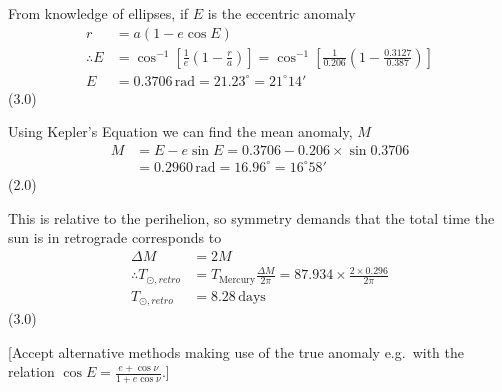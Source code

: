 From knowledge of ellipses, if $E$ is the eccentric anomaly
\begin{align*}
r &= a(1 - e\cos E)\\
\therefore E &= \cos^{-1}\left[\frac{1}{e}\left(1 - \frac{r}{a}\right)\right]
  = \cos^{-1}\left[\frac{1}{0.206}\left(1 - \frac{0.3127}{0.387}\right)\right]\\
E &= 0.3706\,\mathrm{rad} = 21.23^\circ = 21^\circ 14'
\end{align*}
\hfill(3.0)

Using Kepler's Equation we can find the mean anomaly, $M$
\begin{align*}
M &= E - e\sin E = 0.3706 - 0.206 \times \sin 0.3706\\
  &= 0.2960\,\mathrm{rad} = 16.96^\circ = 16^\circ 58'
\end{align*}
\hfill(2.0)

This is relative to the perihelion, so symmetry demands that the total time the sun is in
retrograde corresponds to
\begin{align*}
\Delta M &= 2M\\
\therefore T_{\odot,retro} &= T_{\mathrm{Mercury}}\frac{\Delta M}{2\pi}
  = 87.934 \times \frac{2 \times 0.296}{2\pi}\\
T_{\odot,retro} &= \boxed{8.28\,\mathrm{days}}
\end{align*}
\hfill(3.0)

[Accept alternative methods making use of the true anomaly e.g.\ with the relation
$\cos E = \frac{e + \cos\nu}{1 + e\cos\nu}$.]
